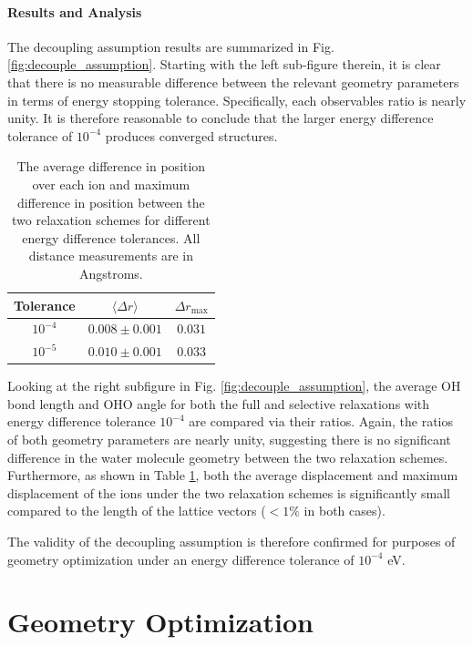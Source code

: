         \paragraph{Results and Analysis} The decoupling assumption results are summarized in Fig. \ref{fig:decouple_assumption}. Starting with the left sub-figure therein, it is clear that there is no measurable difference between the relevant geometry parameters in terms of energy stopping tolerance. Specifically, each observables ratio is nearly unity. It is therefore reasonable to conclude that the larger energy difference tolerance of $10^{-4}$ produces converged structures.
        
        \begin{table}[]
            \centering
            \begin{tabular}{c|c|c}
               Tolerance  & $\langle \Delta r \rangle$ & $\Delta r_\text{max}$  \\
               \hline
               \hline
                $10^{-4}$ & $0.008\pm 0.001$ & $0.031$  \\ 
                $10^{-5}$ & $0.010\pm0.001$& $0.033$ \\ 
            \end{tabular}
            \caption{The average difference in position over each ion and maximum difference in position between the two relaxation schemes for different energy difference tolerances. All distance measurements are in Angstroms.}
            \label{tab:ediff_r_diff}
        \end{table}
        
        Looking at the right subfigure in Fig. \ref{fig:decouple_assumption}, the average OH bond length and OHO angle for both the full and selective relaxations with energy difference tolerance $10^{-4}$ are compared via their ratios. Again, the ratios of both geometry parameters are nearly unity, suggesting there is no significant difference in the water molecule geometry between the two relaxation schemes. Furthermore, as shown in Table \ref{tab:ediff_r_diff}, both the average displacement and maximum displacement of the ions under the two relaxation schemes is significantly small compared to the length of the lattice vectors ($<1\%$ in both cases). 
        
        The validity of the decoupling assumption is therefore confirmed for purposes of geometry optimization under an energy difference tolerance of $10^{-4}$ eV.
    \section{Geometry Optimization}
    \label{sec:geo_opt}
    
